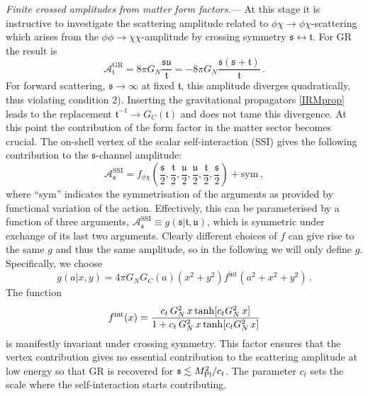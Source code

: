 \documentclass[aps,prl,reprint,twocolumn,superscriptaddress,longbibliography,nofootinbib,floatfix,showpacs]{revtex4-1}
\newcommand{\GR}{{\small GR}}
\newcommand{\be}{\begin{equation}}
\newcommand{\ee}{\end{equation}}
\newcommand{\mans}{\ensuremath{\mathfrak{s}}}
\newcommand{\mant}{\ensuremath{\mathfrak{t}}}
\newcommand{\manu}{\ensuremath{\mathfrak{u}}}
\begin{document}
\textit{Finite crossed amplitudes from matter form factors.}---
At this stage it is instructive to investigate the scattering amplitude related to $\phi\chi \rightarrow \phi\chi$-scattering which arises from the $\phi\phi \rightarrow \chi\chi$-amplitude by crossing symmetry $\mans \leftrightarrow \mant$.
For GR the result is
%
\be\label{crossedscatteringGR}
\mathcal A_\mant^{\text{GR}} = 8 \pi G_N  \frac{\mans \manu}{\mant} = - 8\pi G_N \frac{\mans(\mans+\mant)}{\mant} \, . 
\ee
%
For forward scattering, $\mans \rightarrow \infty$ at fixed $\mant$, this amplitude diverges quadratically, thus violating condition 2).
Inserting the gravitational propagators \eqref{IRMprop} leads to the replacement $\mant^{-1} \rightarrow G_C(\mant)$ and does not tame this divergence.
At this point the contribution of the form factor in the matter sector becomes crucial.
The on-shell vertex of the scalar self-interaction ({\small{SSI}}) gives the following contribution to the $\mans{}$-channel amplitude:
%
	\begin{equation}\label{matterff1}
\mathcal A_\mans^\text{SSI} = f_{\phi\chi}\left(\frac{\mans}{2},\frac{\mant}{2},\frac{\manu}{2},\frac{\manu}{2},\frac{\mant}{2},\frac{\mans}{2}\right) + \text{sym} \, ,
\end{equation}
%
where ``sym'' indicates the symmetrisation of the arguments as provided by functional variation of the action. Effectively, this can be parameterised by a function of three arguments,
%
$\mathcal A_\mans^\text{SSI} \equiv g(\mans|\mant,\manu)$,
%
which is symmetric under exchange of its last two arguments. Clearly different choices of $f$ can give rise to the same $g$ and thus the same amplitude, so in the following we will only define $g$. Specifically, we choose
%
\begin{equation}\label{matterpara}
g(a|x,y) = 4\pi G_N G_C(a) (x^2+y^2) f^{\text{int}}(a^2+x^2+y^2) \, .
\end{equation}
%
The function
%
\be
f^{\rm int}(x) =  \frac{c_t \, G_N^2 \, x \tanh[c_t G_N^2 \, x]}{1 + c_t \, G_N^2 \, x \tanh[c_t G_N^2 \, x]}
\ee
%
is manifestly invariant under crossing symmetry.
This factor ensures that the vertex contribution gives no essential contribution to the scattering amplitude at low energy so that \GR{} is recovered for $\mans \lesssim M_{\rm Pl}^2/c_t$.
The parameter $c_t$  sets the scale where the self-interaction starts contributing.
\end{document}
